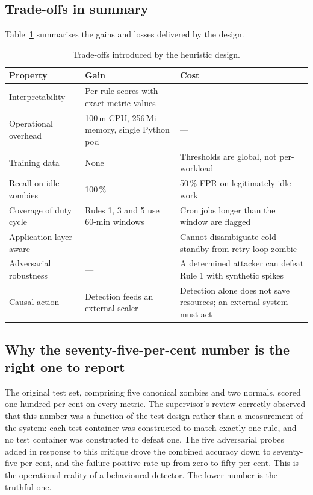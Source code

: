 \documentclass[11pt,a4paper,oneside]{article}
\begin{document}
\subsection{Trade-offs in summary}

Table~\ref{tab:tradeoffs} summarises the gains and losses delivered by
the design.

\begin{table}[H]
\centering
\caption{Trade-offs introduced by the heuristic design.}
\label{tab:tradeoffs}
\small
\begin{tabularx}{\textwidth}{lXX}
\toprule
\textbf{Property}        & \textbf{Gain}                                     & \textbf{Cost} \\
\midrule
Interpretability         & Per-rule scores with exact metric values          & --- \\
Operational overhead     & 100\,m CPU, 256\,Mi memory, single Python pod     & --- \\
Training data            & None                                              & Thresholds are global, not per-workload \\
Recall on idle zombies   & 100\,\%                                           & 50\,\% FPR on legitimately idle work \\
Coverage of duty cycle   & Rules 1, 3 and 5 use 60-min windows               & Cron jobs longer than the window are flagged \\
Application-layer aware  & ---                                               & Cannot disambiguate cold standby from retry-loop zombie \\
Adversarial robustness   & ---                                               & A determined attacker can defeat Rule 1 with synthetic spikes \\
Causal action            & Detection feeds an external scaler                & Detection alone does not save resources; an external system must act \\
\bottomrule
\end{tabularx}
\end{table}

\subsection{Why the seventy-five-per-cent number is the right one to report}

The original test set, comprising five canonical zombies and two
normals, scored one hundred per cent on every metric. The supervisor's
review correctly observed that this number was a function of the test
design rather than a measurement of the system: each test container was
constructed to match exactly one rule, and no test container was
constructed to defeat one. The five adversarial probes added in response
to this critique drove the combined accuracy down to seventy-five per
cent, and the failure-positive rate up from zero to fifty per cent. This
is the operational reality of a behavioural detector. The lower number
is the truthful one.
\end{document}

